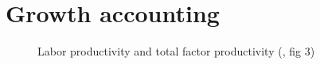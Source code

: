 \documentclass[
  ignorenonframetext,
]{beamer}
\begin{document}
\section{Growth accounting}\label{growth-accounting}

\begin{frame}{}
\label{section-13}
\begin{figure}


\caption{\label{fig-labor-factor-productivity-total-factor-productivity}Labor
productivity and total factor productivity
(,
fig 3)}

\end{figure}%
\end{frame}
\end{document}
